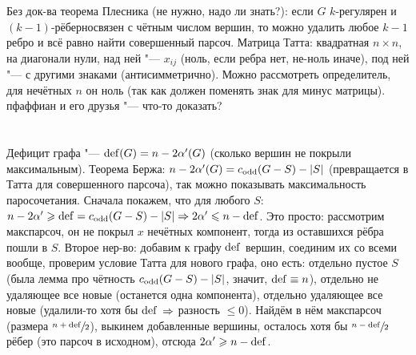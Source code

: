 	Без док-ва теорема Плесника (не нужно, \TODO надо ли знать?): если $G$ $k$-регулярен и $(k-1)$-рёберносвязен с чётным числом вершин,
	то можно удалить любое $k-1$ ребро и всё равно найти совершенный парсоч.
	Матрица Татта: квадратная $n \times n$, на диагонали нули, над ней "--- $x_{ij}$ (ноль, если ребра нет, не-ноль иначе),
	под ней "--- с другими знаками (антисимметрично).
	Можно рассмотреть определитель, для нечётных $n$ он ноль (так как должен поменять знак для минус матрицы).
	\TODO пфаффиан и его друзья "--- что-то доказать?

\section{} %
	Дефицит графа "--- $\mathrm{def}(G) = n-2\alpha'(G)$ (сколько вершин не покрыли максимальным).
	Теорема Бержа: $n-2\alpha'(G)=c_{\mathrm{odd}}(G-S) - |S|$ (превращается в Татта для совершенного парсоча),
	так можно показывать максимальность паросочетания.
	Сначала покажем, что для любого $S$: $n-2\alpha' \geqslant \mathrm{def}=c_{\mathrm{odd}}(G-S)-|S| \Rightarrow 2\alpha' \leqslant n-\mathrm{def}$.
	Это просто: рассмотрим макспарсоч, он не покрыл $x$ нечётных компонент, тогда из оставшихся рёбра пошли в $S$.
	Второе нер-во: добавим к графу $\mathrm{def}$ вершин, соединим их со всеми вообще, проверим условие Татта для нового графа, оно есть:
	отдельно пустое $S$ (была лемма про чётность $c_{\mathrm{odd}}(G-S)-|S|$, значит, $\mathrm{def} \equiv n$),
	отдельно не удаляющее все новые (останется одна компонента),
	отдельно удаляющее все новые (удалили-то хотя бы $\mathrm{def}$ $\Rightarrow$ разность $\le 0$).
	Найдём в нём макспарсоч (размера $\sfrac{n+\mathrm{def}}{2}$), выкинем добавленные вершины, осталось хотя бы $\sfrac{n-\mathrm{def}}{2}$ рёбер (это парсоч в исходном),
	отсюда $2\alpha' \geqslant n-\mathrm{def}$.
